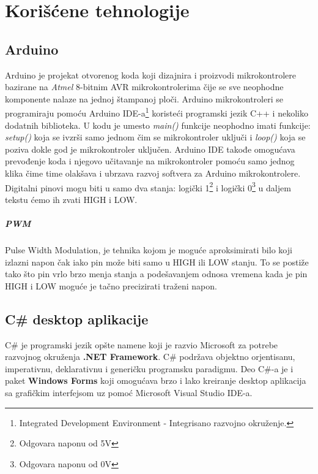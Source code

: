 \documentclass[12pt,oneside]{memoir}
\begin{document}
	\frontmatter

	\naslovna

	\apstrakt
	\tableofcontents*

	\mainmatter

	\chapter{Korišćene tehnologije}
	
	\section{Arduino}
	Arduino je projekat otvorenog koda koji dizajnira i proizvodi mikrokontrolere bazirane na \textit{Atmel} 8-bitnim AVR mikrokontrolerima čije se sve neophodne komponente nalaze na jednoj štampanoj ploči.
	Arduino mikrokontroleri se programiraju pomoću Arduino IDE-a\footnote{Integrated Development Environment - Integrisano razvojno okruženje.} koristeći programski jezik C++ i nekoliko dodatnih biblioteka. U kodu je umesto \textit{main()} funkcije neophodno imati funkcije: \textit{setup()} koja se ivzrši samo jednom čim se mikrokontroler uključi i \textit{loop()} koja se poziva dokle god je mikrokontroler uključen. Arduino IDE takođe omogućava prevođenje koda i njegovo učitavanje na mikrokontroler pomoću samo jednog klika čime time olakšava i ubrzava razvoj softvera za Arduino mikrokontrolere. Digitalni pinovi mogu biti u samo dva stanja: logički 1\footnote{Odgovara naponu od 5V} i logički 0\footnote{Odgovara naponu od 0V} u daljem tekstu ćemo ih zvati HIGH i LOW.
	\paragraph{PWM}\label{PWM}
	Pulse Width Modulation, je tehnika kojom je moguće aproksimirati bilo koji izlazni napon čak iako pin može biti samo u HIGH ili LOW stanju. To se postiže tako što pin vrlo brzo menja stanja a podešavanjem odnosa vremena kada je pin HIGH i LOW moguće je tačno precizirati traženi napon. 
	\section{C\# desktop aplikacije}
	C\# je programski jezik opšte namene koji je razvio Microsoft za potrebe razvojnog okruženja \textbf{.NET Framework}. C\# podržava objektno orjentisanu, imperativnu, deklarativnu i generičku programsku paradigmu. Deo C\#-a je i paket \textbf{Windows Forms} koji omogućava brzo i lako kreiranje desktop aplikacija sa grafičkim interfejsom uz pomoć Microsoft Visual Studio IDE-a.
\end{document}
